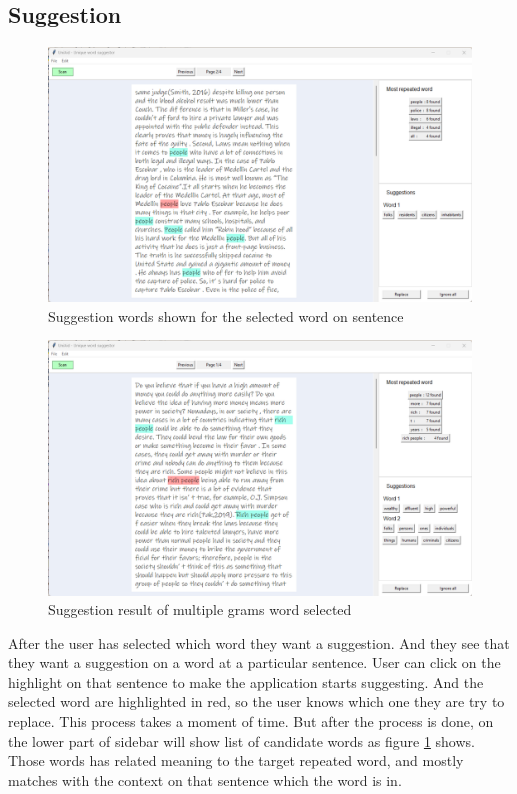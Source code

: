 \documentclass[12pt,oneside,openright,a4paper]{cpe-english-project}
\begin{document}
\subsection{Suggestion}

\begin{figure}[!h]\centering
\includegraphics[width=15cm]{./img/chp4/Suggestion1.png}
\caption{Suggestion words shown for the selected word on sentence}\label{fig:suggest1}
\end{figure}
\begin{figure}[!h]\centering
\includegraphics[width=15cm]{./img/chp4/Suggestion2.png}
\caption{Suggestion result of multiple grams word selected}\label{fig:suggest2}
\end{figure}
After the user has selected which word they want a suggestion. And they see that they want a suggestion on a word at a particular sentence. User can click on the highlight on that sentence to make the application starts suggesting. And the selected word are highlighted in red, so the user knows which one they are try to replace. This process takes a moment of time. But after the process is done, on the lower part of sidebar will show list of candidate words as figure \ref{fig:suggest1} shows. Those words has related meaning to the target repeated word, and mostly matches with the context on that sentence which the word is in.
\end{document}
